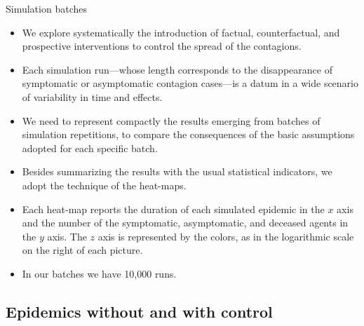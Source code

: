\documentclass[9pt]{beamer}
\begin{document}
\begin{frame}{Simulation batches}

  \begin{itemize}
  \item

We explore systematically the introduction of factual, counterfactual, and prospective interventions to control the spread of the contagions. 

  \item
Each simulation run---whose length corresponds to the disappearance of symptomatic or asymptomatic contagion cases---is a datum in a wide scenario of variability in time and effects.   
  
  \item
We need to represent compactly the results  emerging from batches of simulation repetitions, to compare the  consequences of the basic assumptions adopted for each specific batch.

 \item
Besides summarizing the results with the usual statistical indicators, we adopt the technique of the heat-maps.

\item
Each heat-map reports the duration of each simulated epidemic in the $x$ axis and the number of the symptomatic, asymptomatic, and deceased agents in the $y$ axis. The $z$ axis is represented by the colors, as in the logarithmic scale on the right of each picture. 

\item
In our batches we have 10,000 runs.

\end{itemize}
\end{frame}

\subsection{Epidemics without and with control}
\end{document}
